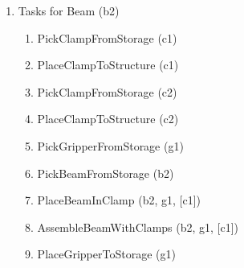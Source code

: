 {\begin{enumerate}
\begin{enumerate}
	\item {\footnotesize PickGripperFromStorage (g1)}

	\item {\footnotesize PickBeamFromStorage (b1)}

	\item {\footnotesize PlaceBeamInClamp (b1, g1, [c1])}

	\item {\footnotesize AssembleBeamWithClamps (b1, g1, [c1])}

	\item {\footnotesize PlaceGripperToStorage (g1)}

	\item {\footnotesize PickClampFromStructure (c2)}

	\item {\footnotesize PlaceClampToStorage (c2)}

	\item {\footnotesize PickClampFromStructure (c1)}

	\item {\footnotesize PlaceClampToStorage (c1)}

\end{enumerate}
	\item {\footnotesize Tasks for Beam (b2) }

\begin{enumerate}
	\item {\footnotesize PickClampFromStorage (c1)}

	\item {\footnotesize PlaceClampToStructure (c1)}

	\item {\footnotesize PickClampFromStorage (c2)}

	\item {\footnotesize PlaceClampToStructure (c2)}

	\item {\footnotesize PickGripperFromStorage (g1)}

	\item {\footnotesize PickBeamFromStorage (b2)}

	\item {\footnotesize PlaceBeamInClamp (b2, g1, [c1])}

	\item {\footnotesize AssembleBeamWithClamps (b2, g1, [c1])}

	\item {\footnotesize PlaceGripperToStorage (g1)}


\end{enumerate}
\end{enumerate}}
